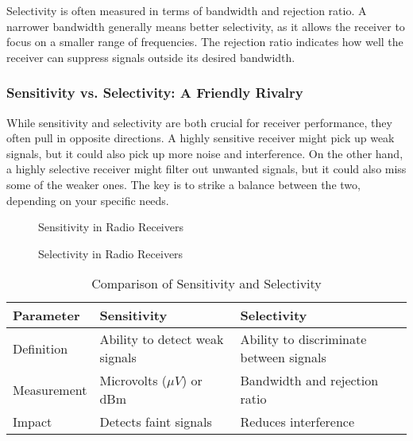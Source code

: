 Selectivity is often measured in terms of bandwidth and rejection ratio. A narrower bandwidth generally means better selectivity, as it allows the receiver to focus on a smaller range of frequencies. The rejection ratio indicates how well the receiver can suppress signals outside its desired bandwidth.

\subsubsection*{Sensitivity vs. Selectivity: A Friendly Rivalry}
While sensitivity and selectivity are both crucial for receiver performance, they often pull in opposite directions. A highly sensitive receiver might pick up weak signals, but it could also pick up more noise and interference. On the other hand, a highly selective receiver might filter out unwanted signals, but it could also miss some of the weaker ones. The key is to strike a balance between the two, depending on your specific needs.

\begin{figure}[h]
    \centering
    \caption{Sensitivity in Radio Receivers}
    \label{fig:sensitivity-diagram}
\end{figure}

\begin{figure}[h]
    \centering
    \caption{Selectivity in Radio Receivers}
    \label{fig:selectivity-diagram}
\end{figure}

\begin{table}[h]
    \centering
    \begin{tabular}{|l|l|l|}
        \hline
        \textbf{Parameter} & \textbf{Sensitivity} & \textbf{Selectivity} \\
        \hline
        Definition & Ability to detect weak signals & Ability to discriminate between signals \\
        \hline
        Measurement & Microvolts ($\mu V$) or dBm & Bandwidth and rejection ratio \\
        \hline
        Impact & Detects faint signals & Reduces interference \\
        \hline
    \end{tabular}
    \caption{Comparison of Sensitivity and Selectivity}
    \label{tab:sensitivity-selectivity}
\end{table}

